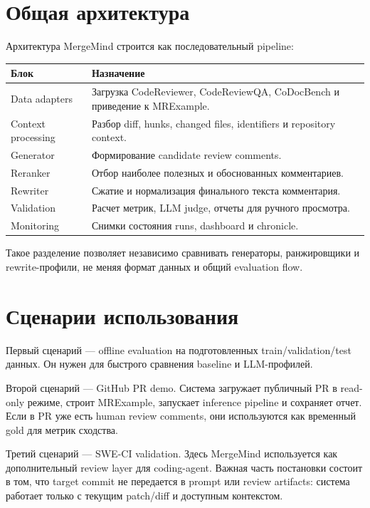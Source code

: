 \documentclass[14pt,a4paper]{extreport}
\begin{document}
\section{Общая архитектура}

Архитектура MergeMind строится как последовательный pipeline:

\begin{center}
\begin{tabular}{>{\raggedright\arraybackslash}p{}
                >{\raggedright\arraybackslash}p{}}
  \toprule
  Блок & Назначение \\
  \midrule
  Data adapters & Загрузка CodeReviewer, CodeReviewQA, CoDocBench и приведение к MRExample. \\
  Context processing & Разбор diff, hunks, changed files, identifiers и repository context. \\
  Generator & Формирование candidate review comments. \\
  Reranker & Отбор наиболее полезных и обоснованных комментариев. \\
  Rewriter & Сжатие и нормализация финального текста комментария. \\
  Validation & Расчет метрик, LLM judge, отчеты для ручного просмотра. \\
  Monitoring & Снимки состояния runs, dashboard и chronicle. \\
  \bottomrule
\end{tabular}
\end{center}

Такое разделение позволяет независимо сравнивать генераторы, ранжировщики и
rewrite-профили, не меняя формат данных и общий evaluation flow.

\section{Сценарии использования}

Первый сценарий --- offline evaluation на подготовленных train/validation/test
данных. Он нужен для быстрого сравнения baseline и LLM-профилей.

Второй сценарий --- GitHub PR demo. Система загружает публичный PR в read-only
режиме, строит MRExample, запускает inference pipeline и сохраняет отчет. Если
в PR уже есть human review comments, они используются как временный gold для
метрик сходства.

Третий сценарий --- SWE-CI validation. Здесь MergeMind используется как
дополнительный review layer для coding-agent. Важная часть постановки состоит в
том, что target commit не передается в prompt или review artifacts: система
работает только с текущим patch/diff и доступным контекстом.
\end{document}
